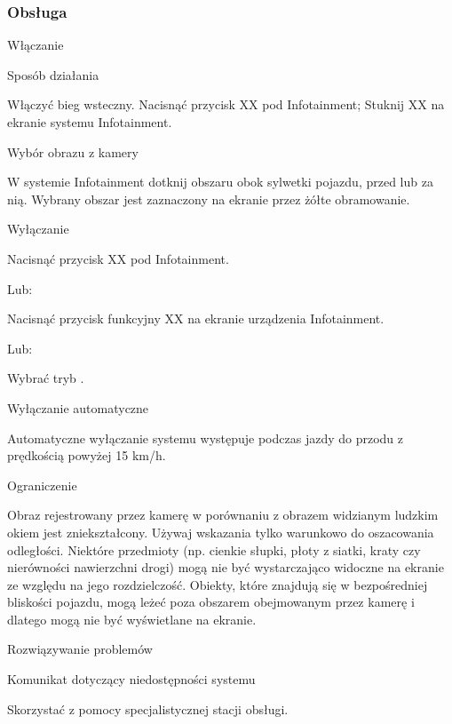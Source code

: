 \subsubsection{Obsługa}

Włączanie

Sposób działania
\begin{itemizeArrow}
	\itemArrow Włączyć bieg wsteczny.
	\itemArrow Nacisnąć przycisk XX pod Infotainment; Stuknij XX na ekranie systemu Infotainment.
\end{itemizeArrow}

Wybór obrazu z kamery
\begin{itemizeArrow}
	\itemArrow W systemie Infotainment dotknij obszaru obok sylwetki pojazdu, przed lub za nią. Wybrany obszar jest zaznaczony na ekranie przez żółte obramowanie.
\end{itemizeArrow}

Wyłączanie

\begin{itemizeArrow}
	\itemArrow Nacisnąć przycisk XX pod Infotainment.
\end{itemizeArrow}
Lub:
\begin{itemizeArrow}
	\itemArrow Nacisnąć przycisk funkcyjny XX na ekranie urządzenia Infotainment.
\end{itemizeArrow}
Lub:
\begin{itemizeArrow}
	\itemArrow Wybrać tryb \gearP.
\end{itemizeArrow}

Wyłączanie automatyczne

Automatyczne wyłączanie systemu występuje podczas jazdy do przodu z prędkością powyżej 15 km/h.

Ograniczenie

Obraz rejestrowany przez kamerę w porównaniu z obrazem widzianym ludzkim okiem jest zniekształcony. Używaj wskazania tylko warunkowo do oszacowania odległości.
Niektóre przedmioty (np. cienkie słupki, płoty z siatki, kraty czy nierówności nawierzchni drogi) mogą nie być wystarczająco widoczne na ekranie ze względu
na jego rozdzielczość.
Obiekty, które znajdują się w bezpośredniej bliskości pojazdu, mogą leżeć poza obszarem obejmowanym przez kamerę i dlatego mogą nie być wyświetlane na ekranie.

Rozwiązywanie problemów

Komunikat dotyczący niedostępności systemu
\begin{itemizeArrow}
	\itemArrow Skorzystać z pomocy specjalistycznej stacji obsługi.
\end{itemizeArrow}

